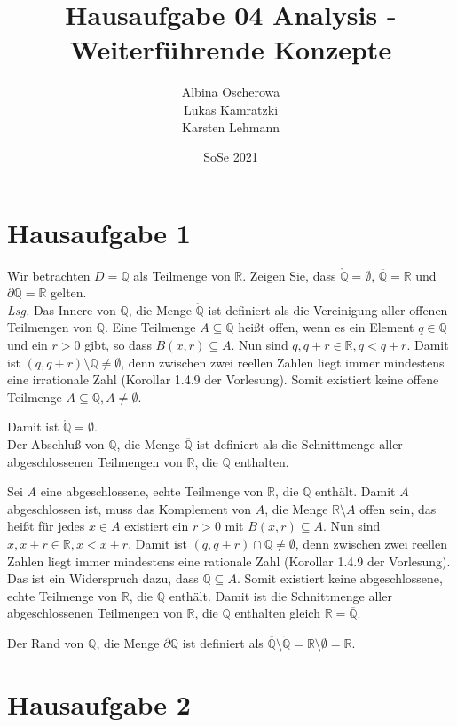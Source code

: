 \documentclass{article}
\author{Albina Oscherowa \\ Lukas Kamratzki \\ Karsten Lehmann}
\date{SoSe 2021}
\title{Hausaufgabe 04 Analysis - Weiterführende Konzepte}
\begin{document}
\section*{Hausaufgabe 1}

Wir betrachten $D = \mathbb{Q}$ als Teilmenge von $\mathbb{R}$.
Zeigen Sie, dass $\mathring{\mathbb{Q}} = \emptyset$, $\overline{\mathbb{Q}} = \mathbb{R}$
und $\partial \mathbb{Q} = \mathbb{R}$ gelten. \\

\textit{Lsg.} Das Innere von $\mathbb{Q}$, die Menge $\mathring{\mathbb{Q}}$ ist definiert als die Vereinigung aller
offenen Teilmengen von $\mathbb{Q}$.
Eine Teilmenge $A \subseteq \mathbb{Q}$ heißt offen, wenn es ein Element $q \in \mathbb{Q}$
und ein $r > 0$ gibt, so dass $B(x, r) \subseteq A$.
Nun sind $q, q + r \in \mathbb{R}, q < q + r$.
Damit ist $(q, q + r) \setminus \mathbb{Q} \ne \emptyset$, denn zwischen zwei reellen Zahlen liegt
immer mindestens eine irrationale Zahl (Korollar 1.4.9 der Vorlesung).
Somit existiert keine offene Teilmenge $A \subseteq \mathbb{Q}, A \ne \emptyset$.

Damit ist $\mathring{\mathbb{Q}} = \emptyset$. \\

Der Abschluß von $\mathbb{Q}$, die Menge $\overline{\mathbb{Q}}$ ist definiert als
die Schnittmenge aller abgeschlossenen Teilmengen von $\mathbb{R}$, die $\mathbb{Q}$
enthalten.

Sei $A$ eine abgeschlossene, echte Teilmenge von $\mathbb{R}$, die $\mathbb{Q}$ enthält.
Damit $A$ abgeschlossen ist, muss das Komplement von $A$, die Menge $\mathbb{R} \setminus A$
offen sein, das heißt für jedes $x \in A$ existiert ein $r > 0$ mit $B(x, r) \subseteq A$.
Nun sind $x, x + r \in \mathbb{R}, x < x + r$.
Damit ist $(q, q + r) \cap \mathbb{Q} \ne \emptyset$, denn zwischen zwei reellen Zahlen liegt
immer mindestens eine rationale Zahl (Korollar 1.4.9 der Vorlesung).
Das ist ein Widerspruch dazu, dass $\mathbb{Q} \subseteq A$.
Somit existiert keine abgeschlossene, echte Teilmenge von $\mathbb{R}$, die $\mathbb{Q}$ enthält.
Damit ist die Schnittmenge aller abgeschlossenen Teilmengen von $\mathbb{R}$, die $\mathbb{Q}$
enthalten gleich $\mathbb{R} = \overline{\mathbb{Q}}$.

Der Rand von $\mathbb{Q}$, die Menge $\partial \mathbb{Q}$ ist definiert als
$\overline{\mathbb{Q}} \setminus \mathring{\mathbb{Q}} = \mathbb{R} \setminus \emptyset = \mathbb{R}$.

\section*{Hausaufgabe 2}
\end{document}
